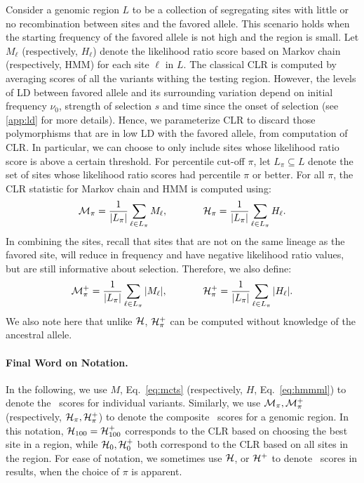 Consider a genomic region $L$ to be a collection of segregating sites
with little or no recombination between sites and the favored
allele. This scenario holds when the starting frequency of the favored
allele is not high and the region is small. Let $M_\ell$
(respectively, $H_\ell$) denote the likelihood ratio score based on
Markov chain (respectively, HMM) for each site $\ell$ in $L$. The
classical CLR is computed by averaging scores of all the variants
withing the testing region.  However, the levels of LD between favored
allele and its surrounding variation depend on initial frequency
$\nu_0$, strength of selection $s$ and time since the onset of
selection (see \ref{app:ld} for more details).  Hence, we
parameterize CLR to discard those polymorphisms that are in low LD
with the favored allele, from computation of CLR.  In particular, we
can choose to only include sites whose likelihood ratio score is above
a certain threshold. For percentile cut-off $\pi$, let
$L_{\pi}\subseteq L$ denote the set of sites whose likelihood ratio
scores had percentile $\pi$ or better. For all $\pi$, the CLR
statistic for Markov chain and HMM is computed using: 
\begin{equation}
 {\cal M}_{\pi} = \frac{1}{|L_{\pi}|}\sum_{\ell \in L_{\pi}}M_\ell,
\hspace{0.5in}
 {\cal H}_{\pi} = \frac{1}{|L_{\pi}|}\sum_{\ell \in L_{\pi}} H_\ell.
\label{eq:pihmm}
\end{equation}
In combining the sites, recall that sites that are not on the same
lineage as the favored site, will reduce in frequency and have
negative likelihood ratio values, but are still informative about
selection. Therefore, we also define:
\begin{equation}
 {\cal M}^{+}_{\pi} = \frac{1}{|L_{\pi}|}\sum_{\ell \in L_{\pi}}\vert M_\ell\vert ,
\hspace{0.5in}
 {\cal H}^{+}_{\pi} = \frac{1}{|L_{\pi}|}\sum_{\ell \in L_{\pi}}\vert H_\ell\vert.
\label{eq:pihmmplus}
\end{equation}
We also note here that unlike ${\cal H}$, ${\cal H}^{+}_{\pi}$ can be computed
without knowledge of the ancestral allele.
\paragraph{Final Word on Notation.}
In the following, we use $M$, Eq.~\ref{eq:mcts} (respectively, $H$,
Eq.~\ref{eq:hmmml}) to denote the \comale\ scores for individual
variants. Similarly, we use ${\cal M}_{\pi},{\cal M}^{+}_{\pi}$ (respectively,
${\cal H}_{\pi},{\cal H}^{+}_{\pi}$) to denote the composite \comale\ scores for
a genomic region. In this notation, ${\cal H}_{100}={\cal
  H}^{+}_{100}$ corresponds to the CLR based on choosing the best site
in a region, while ${\cal H}_0,{\cal H}^{+}_0$ both correspond to the CLR based
on all sites in the region. For ease of notation, we sometimes use
${\cal H}$, or ${\cal H}^{+}$ to denote \comale\ scores in results, when the
choice of $\pi$ is apparent.

